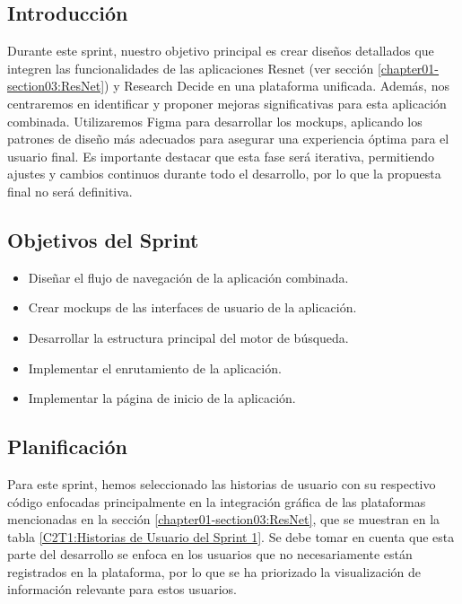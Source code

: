 \subsection{Introducción}
Durante este sprint, nuestro objetivo principal es crear diseños detallados que integren las funcionalidades de las aplicaciones Resnet (ver sección \ref{chapter01-section03:ResNet}) y Research Decide en una plataforma unificada. Además, nos centraremos en identificar y proponer mejoras significativas para esta aplicación combinada. Utilizaremos Figma para desarrollar los mockups, aplicando los patrones de diseño más adecuados para asegurar una experiencia óptima para el usuario final. Es importante destacar que esta fase será iterativa, permitiendo ajustes y cambios continuos durante todo el desarrollo, por lo que la propuesta final no será definitiva.
\subsection{Objetivos del Sprint}

\begin{itemize}
    \item Diseñar el flujo de navegación de la aplicación combinada.
    \item Crear mockups de las interfaces de usuario de la aplicación.
    \item Desarrollar la estructura  principal del motor de búsqueda.
    \item Implementar el enrutamiento de la aplicación.
    \item Implementar la página de inicio de la aplicación.
\end{itemize}
\subsection{Planificación}
Para este sprint, hemos seleccionado las historias de usuario con su respectivo código enfocadas principalmente en la integración gráfica de las plataformas mencionadas en la sección \ref{chapter01-section03:ResNet}, que se muestran en la tabla \ref{C2T1:Historias de Usuario del Sprint 1}. 
Se debe tomar en cuenta que esta parte del desarrollo se enfoca en los usuarios que no necesariamente están registrados en la plataforma, por lo que se ha priorizado la visualización de información relevante para estos usuarios.


